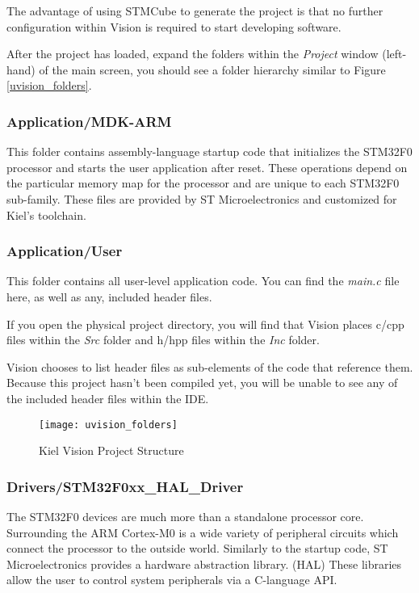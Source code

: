 \documentclass[11pt,fleqn]{book} %
\begin{document}
The advantage of using STMCube to generate the project is that no further configuration within {\textmu}Vision is required to start developing software. 

After the project has loaded, expand the folders within the \textit{Project} window (left-hand) of the main screen, you should see a folder hierarchy similar to Figure \vref{uvision_folders}.

\subsubsection*{Application/MDK-ARM}
This folder contains assembly-language startup code that initializes the STM32F0 processor and starts the user application after reset.  These operations depend on the particular memory map for the processor and are unique to each STM32F0 sub-family. These files are provided by ST Microelectronics and customized for Kiel's toolchain. 

\subsubsection*{Application/User}
This folder contains all user-level application code. You can find the \textit{main.c} file here, as well as any, included header files. 

If you open the physical project directory, you will find that {\textmu}Vision places c/cpp files within the \textit{Src} folder and h/hpp files within the \textit{Inc} folder. 
 
\begin{warning}
	{\textmu}Vision chooses to list header files as sub-elements of the code that reference them. Because this project hasn't been compiled yet, you will be unable to see any of the included header files within the IDE.
\end{warning}

\begin{figure}[h!]
	\centering\texttt{[image: uvision\_folders]}
	\caption{Kiel {\textmu}Vision Project Structure}
	\label{uvision_folders}
\end{figure}

\subsubsection*{Drivers/STM32F0xx\_HAL\_Driver}
The STM32F0 devices are much more than a standalone processor core. Surrounding the ARM Cortex-M0 is a wide variety of peripheral circuits which connect the processor to the outside world. Similarly to the startup code, ST Microelectronics provides a hardware abstraction library. (HAL) These libraries allow the user to control system peripherals via a C-language API. %
\end{document}
